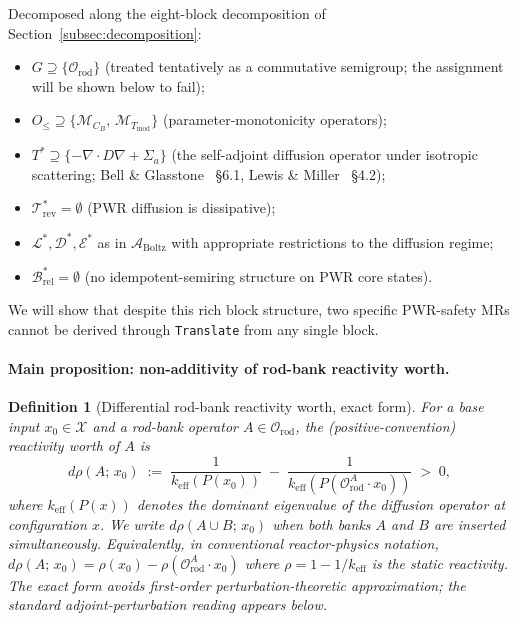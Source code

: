 \documentclass[acmsmall, screen]{acmart}
\newtheorem{definition}{Definition}
\begin{document}
Decomposed along the eight-block decomposition of Section~\ref{subsec:decomposition}:
\begin{itemize}[nosep,leftmargin=*]
  \item $G \supseteq \{\mathcal{O}_{\mathrm{rod}}\}$ (treated tentatively as a commutative semigroup; the assignment will be shown below to fail);
  \item $O_{\le} \supseteq \{\mathcal{M}_{C_{B}},\,\mathcal{M}_{T_{\mathrm{mod}}}\}$ (parameter-monotonicity operators);
  \item $T^{*} \supseteq \{-\nabla \cdot D \nabla + \Sigma_{a}\}$ (the self-adjoint diffusion operator under isotropic scattering; Bell \& Glasstone~\cite{BellGlasstone1970} \S6.1, Lewis \& Miller~\cite{LewisMiller1993} \S4.2);
  \item $\mathcal{T}_{\mathrm{rev}}^{*} = \emptyset$ (PWR diffusion is dissipative);
  \item $\mathcal{L}^{*}, \mathcal{D}^{*}, \mathcal{E}^{*}$ as in $\mathcal{A}_{\mathrm{Boltz}}$ with appropriate restrictions to the diffusion regime;
  \item $\mathcal{B}_{\mathrm{rel}}^{*} = \emptyset$ (no idempotent-semiring structure on PWR core states).
\end{itemize}

We will show that despite this rich block structure, two specific PWR-safety MRs cannot be derived through \texttt{Translate} from any single block.

\paragraph{Main proposition: non-additivity of rod-bank reactivity worth.}
\label{subsubsec:nonadd}

\begin{definition}[Differential rod-bank reactivity worth, exact form]
\label{def:drho-exact}
For a base input $x_{0} \in \mathcal{X}$ and a rod-bank operator $A \in \mathcal{O}_{\mathrm{rod}}$, the (positive-convention) reactivity worth of $A$ is
\[
d\rho(A;\,x_{0}) \;:=\; \frac{1}{k_{\mathrm{eff}}(P(x_{0}))} \;-\; \frac{1}{k_{\mathrm{eff}}(P(\mathcal{O}_{\mathrm{rod}}^{A} \cdot x_{0}))} \;>\; 0,
\]
where $k_{\mathrm{eff}}(P(x))$ denotes the dominant eigenvalue of the diffusion operator at configuration $x$. We write $d\rho(A \cup B;\,x_{0})$ when both banks $A$ and $B$ are inserted simultaneously. Equivalently, in conventional reactor-physics notation, $d\rho(A;\,x_{0}) = \rho(x_{0}) - \rho(\mathcal{O}_{\mathrm{rod}}^{A} \cdot x_{0})$ where $\rho = 1 - 1/k_{\mathrm{eff}}$ is the static reactivity. The exact form avoids first-order perturbation-theoretic approximation; the standard adjoint-perturbation reading appears below.
\end{definition}
\end{document}
